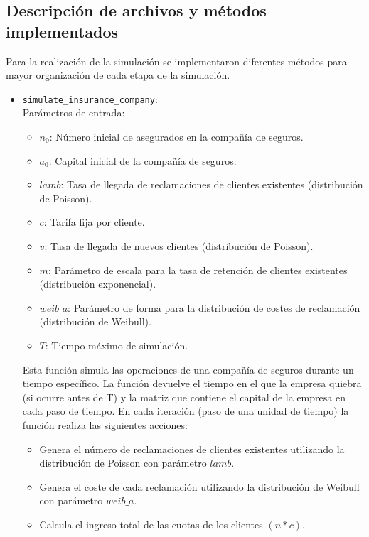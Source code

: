 \documentclass{article}
\begin{document}
 \subsection{Descripción de archivos y métodos implementados}
 Para la realización de la simulación se implementaron diferentes métodos para mayor organización de cada etapa de la simulación. 

 \begin{itemize}
    \item \texttt{simulate\_insurance\_company}: \\
        Parámetros de entrada:
        \begin{itemize}
            \item $n_0$: Número inicial de asegurados en la compañía de seguros.
            \item $a_0$: Capital inicial de la compañía de seguros.
            \item $lamb$: Tasa de llegada de reclamaciones de clientes existentes (distribución de Poisson).
            \item $c$: Tarifa fija por cliente. 
            \item $v$: Tasa de llegada de nuevos clientes (distribución de Poisson).
            \item $m$: Parámetro de escala para la tasa de retención de clientes existentes (distribución exponencial).
            \item $weib\_a$: Parámetro de forma para la distribución de costes de reclamación (distribución de Weibull).
            \item $T$: Tiempo máximo de simulación.
        \end{itemize}
        Esta función simula las operaciones de una compañía de seguros durante un tiempo específico. La función devuelve el tiempo en el que la empresa quiebra (si ocurre antes de T) y la matriz que contiene el capital de la empresa en cada paso de tiempo.
        En cada iteración (paso de una unidad de tiempo) la función realiza las siguientes acciones:
        \begin{itemize}
            \item Genera el número de reclamaciones de clientes existentes utilizando la distribución de Poisson con parámetro $lamb$.
            \item Genera el coste de cada reclamación utilizando la distribución de Weibull con parámetro $weib\_a$.
            \item Calcula el ingreso total de las cuotas de los clientes $(n * c)$.

\end{itemize}
\end{itemize}
\end{document}
